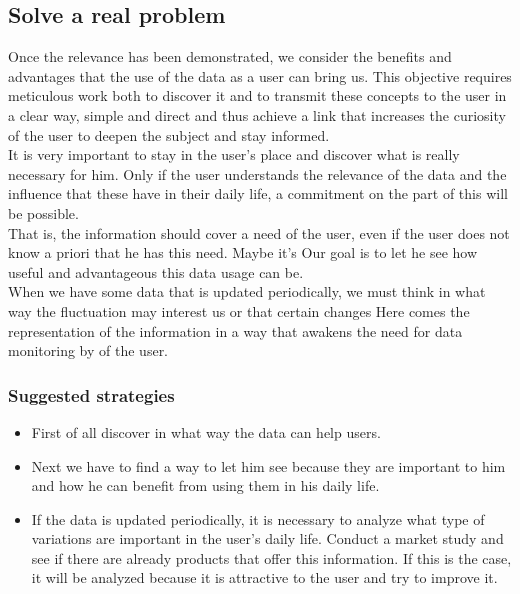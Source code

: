 \subsection{Solve a real problem}

Once the relevance has been demonstrated, we consider the benefits and advantages that the use of the data as a user can bring us.
This objective requires meticulous work both to discover it and to transmit these concepts to the user in a clear way,
simple and direct and thus achieve a link that increases the curiosity of the user to deepen the subject and
stay informed.\\

It is very important to stay in the user's place and discover what is really necessary for him. Only if the user understands the relevance of
the data and the influence that these have in their daily life, a commitment on the part of this will be possible.\\

That is, the information should cover a need of the user, even if the user does not know a priori that he has this need. Maybe it's
Our goal is to let he see how useful and advantageous this data usage can be.\\

When we have some data that is updated periodically, we must think in what way the fluctuation may interest us or that certain
changes Here comes the representation of the information in a way that awakens the need for data monitoring by
of the user.

\subsubsection*{Suggested strategies} 

\begin{itemize}
    \item First of all discover in what way the data can help users.
    \item Next we have to find a way to let him see
    because they are important to him and how he can benefit from using them in his daily life.
    \item If the data is updated periodically, it is necessary to analyze what type of variations are important in the user's daily life.
    Conduct a market study and see if there are already products that offer this information. If this is the case, it will be analyzed because
    it is attractive to the user and try to improve it.
\end{itemize}

